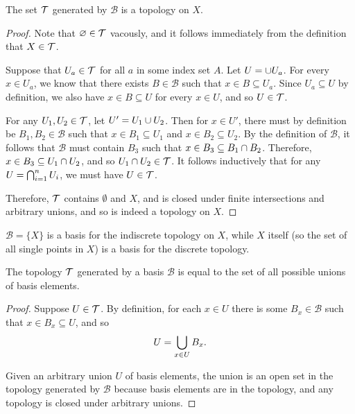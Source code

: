 \begin{prop}\label{prop:basis-generates-topology}
    The set $\mathcal{T}$ generated by $\mathcal{B}$ is a topology on $X$.
\end{prop}

\begin{proof}
    Note that $\varnothing \in \mathcal{T}$ vacously, and it follows immediately from the definition that $X \in \mathcal{T}$.

    Suppose that $U_a \in \mathcal{T}$ for all $a$ in some index set $A$. Let $U = \cup U_a$. For every $x \in U_a$, we know that there exists $B \in \mathcal{B}$ such that $x \in B \subseteq U_a$. Since $U_a \subseteq U$ by definition, we also have $x \in B \subseteq U$ for every $x \in U$, and so $U \in \mathcal{T}$.

    For any $U_1, U_2 \in \mathcal{T}$, let $U' = U_1 \cup U_2$. Then for $x \in U'$, there must by definition be $B_1, B_2 \in \mathcal{B}$ such that $x \in B_1 \subseteq U_1$ and $x \in B_2 \subseteq U_2$. By the definition of $\mathcal{B}$, it follows that $\mathcal{B}$ must contain $B_3$ such that $x \in B_3 \subseteq B_1 \cap B_2$. Therefore, $x \in B_3 \subseteq U_1 \cap U_2$, and so $U_1 \cap U_2 \in \mathcal{T}$. It follows inductively that for any $U = \bigcap_{i=1}^{n}U_i$, we must have $U \in \mathcal{T}$.

    Therefore, $\mathcal{T}$ contains $\emptyset$ and $X$, and is closed under finite intersections and arbitrary unions, and so is indeed a topology on $X$.
\end{proof}

\begin{exmp}
    $\mathcal{B} = \{X\}$ is a basis for the indiscrete topology on $X$, while $X$ itself (so the set of all single points in $X$) is a basis for the discrete topology.
\end{exmp}

\begin{lemma}\label{lemma:basis-is-union-collection}
    The topology $\mathcal{T}$ generated by a basis $\mathcal{B}$ is equal to the set of all possible unions of basis elements.
\end{lemma}

\begin{proof}
    Suppose $U \in \mathcal{T}$. By definition, for each $x \in U$ there is some $B_x \in \mathcal{B}$ such that $x \in B_x \subseteq U$, and so
    \begin{align*}
        U = \bigcup_{x\in U}B_x.
    \end{align*}

    Given an arbitrary union $U$ of basis elements, the union is an open set in the topology generated by $\mathcal{B}$ because basis elements are in the topology, and any topology is closed under arbitrary unions.
\end{proof}

